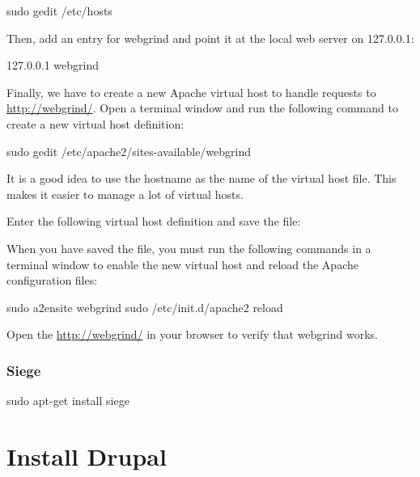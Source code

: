 \documentclass[ebook,10pt,twoside,openright]{memoir}
\begin{document}
\begin{squashboxcommand}
sudo gedit /etc/hosts
\end{squashboxcommand}

Then, add an entry for webgrind and point it at the local web server on 127.0.0.1:

\begin{squashboxoutput}
127.0.0.1   webgrind
\end{squashboxoutput}

Finally, we have to create a new Apache virtual host to handle requests to \url{http://webgrind/}. Open a terminal window and run the following command to create a new virtual host definition:

\begin{squashboxcommand}
sudo gedit /etc/apache2/sites-available/webgrind
\end{squashboxcommand}

It is a good idea to use the hostname as the name of the virtual host file. This makes it easier to manage a lot of virtual hosts.

Enter the following virtual host definition and save the file:

\begin{squashboxoutput}
\end{squashboxoutput}

When you have saved the file, you must run the following commands in a terminal window to enable the new virtual host and reload the Apache configuration files:

\begin{squashboxcommand}
sudo a2ensite webgrind
sudo /etc/init.d/apache2 reload
\end{squashboxcommand}

Open the \url{http://webgrind/} in your browser to verify that webgrind works.

\subsection{Siege}

\begin{squashboxcommand}
sudo apt-get install siege
\end{squashboxcommand}

\chapter{Install Drupal} \label{chinstalldrupal}
\end{document}
